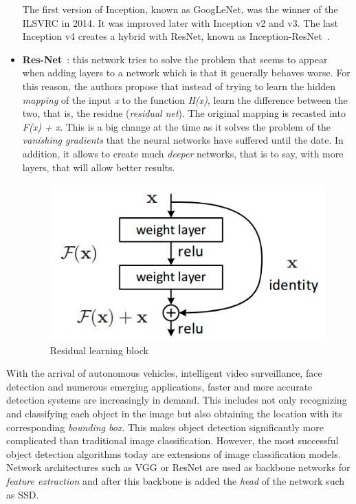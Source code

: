 \begin{itemize}
The first version of Inception, known as GoogLeNet, was the winner of the ILSVRC in 2014. It was improved later with Inception v2 and v3. The last Inception v4 creates a hybrid with ResNet, known as Inception-ResNet~\cite{szegedy2017inception}.
\item \textbf{Res-Net}~\cite{he2016deep}: this network tries to solve the problem that seems to appear when adding layers to a network which is that it generally behaves worse. For this reason, the authors propose that instead of trying to learn the hidden \textit{mapping} of the input \textit{x} to the function \textit{H(x)}, learn the difference between the two, that is, the residue (\textit{residual net}). The original mapping is recasted into \textit{F(x) + x}. This is a big change at the time as it solves the problem of the \textit{vanishing gradients} that the neural networks have suffered until the date. In addition, it allows to create much \textit{deeper} networks, that is to say, with more layers, that will allow better results.
\begin{figure}[H]
\begin{center}
\includegraphics[scale=0.35]{figures/resnet.png}
\caption{Residual learning block \cite{he2016deep}}
\label{fig:resnet}
\end{center}
\end{figure}
\end{itemize}
With the arrival of autonomous vehicles, intelligent video surveillance, face detection and numerous emerging applications, faster and more accurate detection systems are increasingly in demand. This includes not only recognizing and classifying each object in the image but also obtaining the location with its corresponding \textit{bounding box}. This makes object detection significantly more complicated than traditional image classification. However, the most successful object detection algorithms today are extensions of image classification models. Network architectures such as VGG or ResNet are used as backbone networks for \textit{feature extraction} and after this backbone is added the \textit{head} of the network such as SSD.\\
